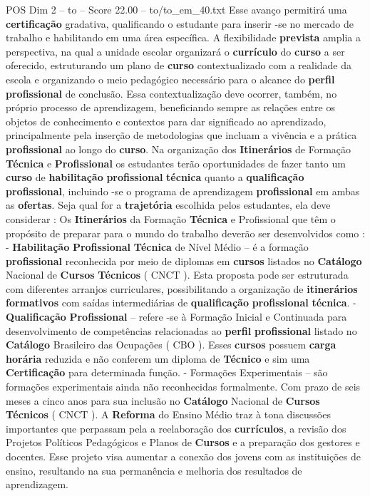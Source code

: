 \begin{textsample}{POS Dim 2 – to – Score 22.00 – to/to\_em\_40.txt}
Esse avanço permitirá uma \textbf{certificação} gradativa, qualificando o estudante para inserir -se no mercado de trabalho e habilitando em uma área específica.
A flexibilidade \textbf{prevista} amplia a perspectiva, na qual a unidade escolar organizará o \textbf{currículo} do \textbf{curso} a ser oferecido, estruturando um plano de \textbf{curso} contextualizado com a realidade da escola e organizando o meio pedagógico necessário para o alcance do \textbf{perfil} \textbf{profissional} de conclusão.
Essa contextualização deve ocorrer, também, no próprio processo de aprendizagem, beneficiando sempre as relações entre os objetos de conhecimento e contextos para dar significado ao aprendizado, principalmente pela inserção de metodologias que incluam a vivência e a prática \textbf{profissional} ao longo do \textbf{curso}.
Na organização dos \textbf{Itinerários} de Formação \textbf{Técnica} e \textbf{Profissional} os estudantes terão oportunidades de fazer tanto um \textbf{curso} de \textbf{habilitação} \textbf{profissional} \textbf{técnica} quanto a \textbf{qualificação} \textbf{profissional}, incluindo -se o programa de aprendizagem \textbf{profissional} em ambas as \textbf{ofertas}.
Seja qual for a \textbf{trajetória} escolhida pelos estudantes, ela deve considerar : Os \textbf{Itinerários} da Formação \textbf{Técnica} e Profissional que têm o propósito de preparar para o mundo do trabalho deverão ser desenvolvidos como : - \textbf{Habilitação} \textbf{Profissional} \textbf{Técnica} de Nível Médio – é a formação \textbf{profissional} reconhecida por meio de diplomas em \textbf{cursos} listados no \textbf{Catálogo} Nacional de \textbf{Cursos} \textbf{Técnicos} ( CNCT ).
Esta proposta pode ser estruturada com diferentes arranjos curriculares, possibilitando a organização de \textbf{itinerários} \textbf{formativos} com saídas intermediárias de \textbf{qualificação} \textbf{profissional} \textbf{técnica}. - \textbf{Qualificação} \textbf{Profissional} – refere -se à Formação Inicial e Continuada para desenvolvimento de competências relacionadas ao \textbf{perfil} \textbf{profissional} listado no \textbf{Catálogo} Brasileiro das Ocupações ( CBO ).
Esses \textbf{cursos} possuem \textbf{carga} \textbf{horária} reduzida e não conferem um diploma de \textbf{Técnico} e sim uma \textbf{Certificação} para determinada função. - Formações Experimentais – são formações experimentais ainda não reconhecidas formalmente.
Com prazo de seis meses a cinco anos para sua inclusão no \textbf{Catálogo} Nacional de \textbf{Cursos} \textbf{Técnicos} ( CNCT ).
A \textbf{Reforma} do Ensino Médio traz à tona discussões importantes que perpassam pela a reelaboração dos \textbf{currículos}, a revisão dos Projetos Políticos Pedagógicos e Planos de \textbf{Cursos} e a preparação dos gestores e docentes.
Esse projeto visa aumentar a conexão dos jovens com as instituições de ensino, resultando na sua permanência e melhoria dos resultados de aprendizagem.

\end{textsample}
